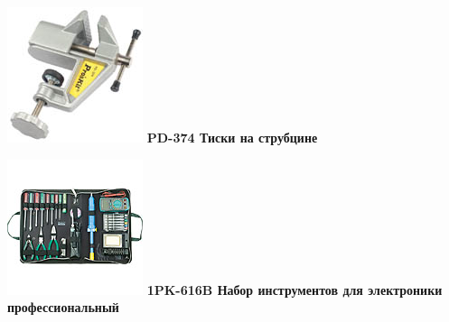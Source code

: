 {\begin{multicols}{2}
\noindent\includegraphics[width=\columnwidth]{00/fig/pros/PD-374.jpg}
\textbf{PD-374 Тиски на струбцине}

\end{multicols}



\begin{multicols}{2}
\noindent\includegraphics[width=\columnwidth]{00/fig/pros/1PK-616B.jpg}
\textbf{1PK-616B Набор инструментов для электроники профессиональный}


\end{multicols}}
